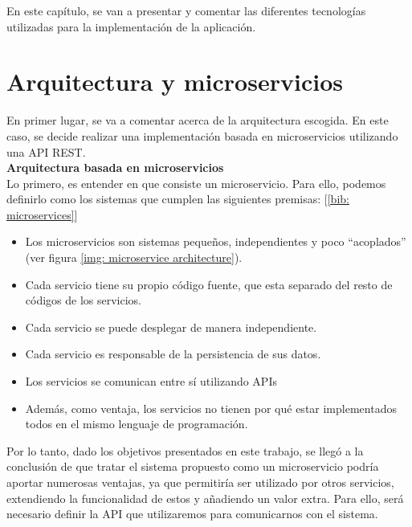 \documentclass[a4paper, oneside, 12pt]{book}
\begin{document}
	\noindent En este capítulo, se van a presentar y comentar las diferentes tecnologías utilizadas para la implementación de la aplicación.
	
	\section{Arquitectura y microservicios}
	
	\noindent En primer lugar, se va a comentar acerca de la arquitectura escogida. En este caso, se decide realizar una implementación basada en microservicios utilizando una API REST. \\
	
	
	\noindent \textbf{\large Arquitectura basada en \textbf{microservicios}} \\
	
	\noindent Lo primero, es entender en que consiste un microservicio. Para ello, podemos definirlo como los sistemas que cumplen las siguientes premisas: [\ref{bib: microservices}]
	
	\begin{itemize}
		\item Los microservicios son sistemas pequeños, independientes y poco ``acoplados'' (ver figura \ref{img: microservice architecture}).
		
		\item Cada servicio tiene su propio código fuente, que esta separado del resto de códigos de los servicios.
		
		\item Cada servicio se puede desplegar de manera independiente. 
		
		\item Cada servicio es responsable de la persistencia de sus datos.
		
		\item Los servicios se comunican entre sí utilizando APIs
		
		\item Además, como ventaja, los servicios no tienen por qué estar implementados todos en el mismo lenguaje de programación.
	\end{itemize}

	\noindent Por lo tanto, dado los objetivos presentados en este trabajo, se llegó a la conclusión de que tratar el sistema propuesto como un microservicio podría aportar numerosas ventajas, ya que permitiría ser utilizado por otros servicios, extendiendo la funcionalidad de estos y añadiendo un valor extra. Para ello, será necesario definir la API que utilizaremos para comunicarnos con el sistema.
	
\end{document}
